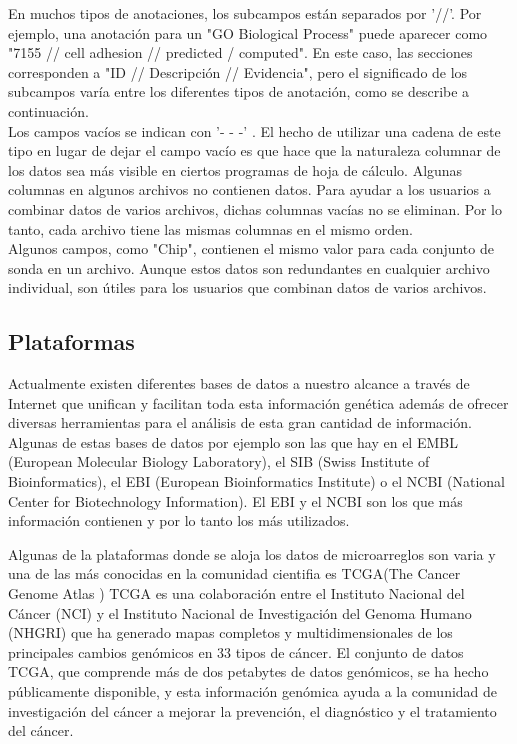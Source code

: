 \documentclass[12pt,letterpaper]{article}
\begin{document}
En muchos tipos de anotaciones, los subcampos están separados por '//'. Por ejemplo,  una anotación para un "GO Biological Process" puede aparecer como "7155 // cell adhesion // predicted / computed".  En este caso, las secciones corresponden a "ID // Descripción // Evidencia", pero el significado de los subcampos varía entre los diferentes tipos de anotación, como se describe a continuación.\\

Los campos vacíos se indican con '- - -' . El hecho de utilizar una cadena de este tipo en lugar de dejar el campo vacío es que hace que la naturaleza columnar de los datos sea más visible en ciertos programas de hoja de cálculo.
Algunas columnas en algunos archivos no contienen datos. Para ayudar a los usuarios a combinar datos de varios archivos, dichas columnas vacías no se eliminan. Por lo tanto, cada archivo tiene las mismas columnas en el mismo orden.\\

Algunos campos, como "Chip", contienen el mismo valor para cada conjunto de sonda en un archivo. Aunque estos datos son redundantes en cualquier archivo individual, son útiles para los usuarios que combinan datos de varios archivos.
\subsection{Plataformas}
Actualmente existen diferentes bases de datos a nuestro alcance a través de Internet
que unifican y facilitan toda esta información genética además de ofrecer diversas
herramientas para el análisis de esta gran cantidad de información. Algunas de estas bases
de datos por ejemplo son las que hay en el EMBL (European Molecular Biology Laboratory),
el SIB (Swiss Institute of Bioinformatics), el EBI (European Bioinformatics Institute) o el NCBI
(National Center for Biotechnology Information). El EBI y el NCBI son los que más
información contienen y por lo tanto los más utilizados. 

Algunas de la plataformas donde se aloja los datos de microarreglos son varia y una de las más conocidas en la comunidad cientifia es TCGA(The Cancer Genome Atlas )
TCGA es una colaboración entre el Instituto Nacional del Cáncer (NCI) y el Instituto Nacional de Investigación del Genoma Humano (NHGRI) que ha generado mapas completos y multidimensionales de los principales cambios genómicos en 33 tipos de cáncer. El conjunto de datos TCGA, que comprende más de dos petabytes de datos genómicos, se ha hecho públicamente disponible, y esta información genómica ayuda a la comunidad de investigación del cáncer a mejorar la prevención, el diagnóstico y el tratamiento del cáncer.
\end{document}
